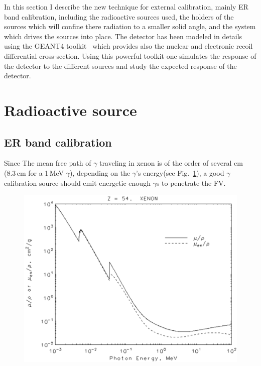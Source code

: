 In this section I describe the new technique for external calibration, mainly ER band calibration, including the radioactive sources used, the holders of the sources which will confine there radiation to a smaller solid angle, and the system which drives the sources into place. The detector has been modeled in details using the GEANT4 toolkit~\cite{AGOSTINELLI2003250} which provides also the nuclear and electronic recoil differential cross-section. Using this powerful toolkit one simulates the response of the detector to the different sources and study the expected response of the detector. 



\section{Radioactive source}
\label{sec:source}
\subsection{ER band calibration}
Since The mean free path of $\gamma$ traveling in xenon is of the order of several cm (8.3\,cm for a 1\,MeV $\gamma$), depending on the $\gamma$'s energy(see Fig.~\ref{fig:MFP}), a good $\gamma$ calibration source should emit energetic enough $\gamma$s to penetrate the FV. 

\begin{figure}
	\begin{center}
	\includegraphics[width=\textwidth]{figs/NISTAttXenon.png}%
		\label{fig:MFP}
		\end{center}
	
\end{figure} 

